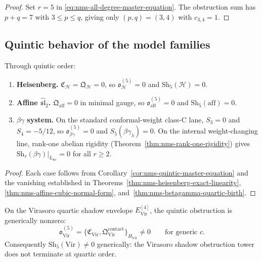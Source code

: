 \begin{proof}
Set $r=5$ in \eqref{eq:nms-all-degree-master-equation}. The
obstruction sum has $p+q=7$ with $3\le p\le q$, giving only
$(p,q)=(3,4)$ with $c_{3,4}=1$.\qedhere
\end{proof}

\subsection{Quintic behavior of the model families}
\label{subsec:nms-quintic-model-families}

\begin{theorem}
\label{thm:nms-quintic-frame-families}
Through quintic order:
\begin{enumerate}[label=\textup{(\roman*)}]
\item \textbf{Heisenberg.}
$\mathfrak C_{\mathcal H}=\mathfrak Q_{\mathcal H}=0$, so $\mathfrak o_{\mathcal H}^{(5)}=0$ and $\mathrm{Sh}_5(\mathcal H)=0$.

\item \textbf{Affine $\widehat{\mathfrak{sl}}_2$.}
$\mathfrak Q_{\mathrm{aff}}=0$ in minimal gauge, so $\mathfrak o_{\mathrm{aff}}^{(5)}=0$ and $\mathrm{Sh}_5(\mathrm{aff})=0$.

\item \textbf{$\beta\gamma$ system.}
On the standard conformal-weight class-C lane, $S_3=0$ and
$S_4=-5/12$, so $\mathfrak o_{\beta\gamma}^{(5)}=0$ and
$S_5(\beta\gamma_\lambda)=0$. On the internal weight-changing line,
rank-one abelian rigidity
(Theorem~\ref{thm:nms-rank-one-rigidity}) gives
$\mathrm{Sh}_r(\beta\gamma)|_{L_{\mathrm{wc}}}=0$ for all $r\ge2$.
\end{enumerate}
\end{theorem}

\begin{proof}
Each case follows from Corollary~\ref{cor:nms-quintic-master-equation} and the vanishing established in Theorems~\ref{thm:nms-heisenberg-exact-linearity}, \ref{thm:nms-affine-cubic-normal-form}, and~\ref{thm:nms-betagamma-quartic-birth}.\qedhere
\end{proof}

\begin{theorem}
\label{thm:nms-virasoro-quintic-forced}
On the Virasoro quartic shadow envelope $E^{[4]}_{\mathrm{Vir}}$, the quintic obstruction is generically nonzero:
\begin{equation}
\label{eq:nms-virasoro-quintic-obstruction}
\mathfrak o_{\mathrm{Vir}}^{(5)}
=
\{\mathfrak C_{\mathrm{Vir}},\mathfrak Q^{\mathrm{contact}}_{\mathrm{Vir}}\}_{H_{\mathrm{Vir}}}
\neq 0
\qquad
\text{for generic $c$}.
\end{equation}
Consequently $\mathrm{Sh}_5(\mathrm{Vir})\neq 0$ generically: the Virasoro shadow obstruction tower does not terminate at quartic order.
\end{theorem}

